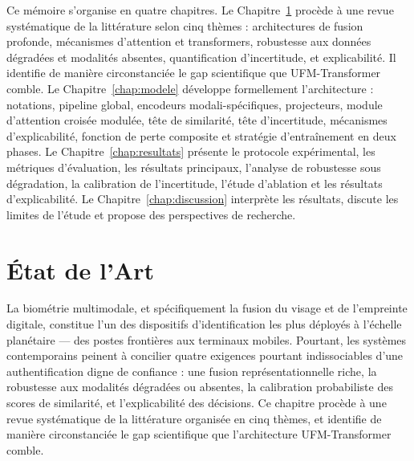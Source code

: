\documentclass[12pt,a4paper]{report}
\begin{document}
Ce m\'{e}moire s'organise en quatre chapitres. Le Chapitre~\ref{chap:etat_art} proc\`{e}de \`{a} une revue syst\'{e}matique de la litt\'{e}rature selon cinq th\`{e}mes : architectures de fusion profonde, m\'{e}canismes d'attention et transformers, robustesse aux donn\'{e}es d\'{e}grad\'{e}es et modalit\'{e}s absentes, quantification d'incertitude, et explicabilit\'{e}. Il identifie de mani\`{e}re circonstanci\'{e}e le gap scientifique que UFM-Transformer comble. Le Chapitre~\ref{chap:modele} d\'{e}veloppe formellement l'architecture : notations, pipeline global, encodeurs modali-sp\'{e}cifiques, projecteurs, module d'attention crois\'{e}e modul\'{e}e, t\^{e}te de similarit\'{e}, t\^{e}te d'incertitude, m\'{e}canismes d'explicabilit\'{e}, fonction de perte composite et strat\'{e}gie d'entra\^{i}nement en deux phases. Le Chapitre~\ref{chap:resultats} pr\'{e}sente le protocole exp\'{e}rimental, les m\'{e}triques d'\'{e}valuation, les r\'{e}sultats principaux, l'analyse de robustesse sous d\'{e}gradation, la calibration de l'incertitude, l'\'{e}tude d'ablation et les r\'{e}sultats d'explicabilit\'{e}. Le Chapitre~\ref{chap:discussion} interpr\`{e}te les r\'{e}sultats, discute les limites de l'\'{e}tude et propose des perspectives de recherche.


\chapter{\'{E}tat de l'Art}
\label{chap:etat_art}

La biom\'{e}trie multimodale, et sp\'{e}cifiquement la fusion du visage et de l'empreinte digitale, constitue l'un des dispositifs d'identification les plus d\'{e}ploy\'{e}s \`{a} l'\'{e}chelle plan\'{e}taire --- des postes fronti\`{e}res aux terminaux mobiles. Pourtant, les syst\`{e}mes contemporains peinent \`{a} concilier quatre exigences pourtant indissociables d'une authentification digne de confiance : une fusion repr\'{e}sentationnelle riche, la robustesse aux modalit\'{e}s d\'{e}grad\'{e}es ou absentes, la calibration probabiliste des scores de similarit\'{e}, et l'explicabilit\'{e} des d\'{e}cisions. Ce chapitre proc\`{e}de \`{a} une revue syst\'{e}matique de la litt\'{e}rature organis\'{e}e en cinq th\`{e}mes, et identifie de mani\`{e}re circonstanci\'{e}e le gap scientifique que l'architecture UFM-Transformer comble.
\end{document}
